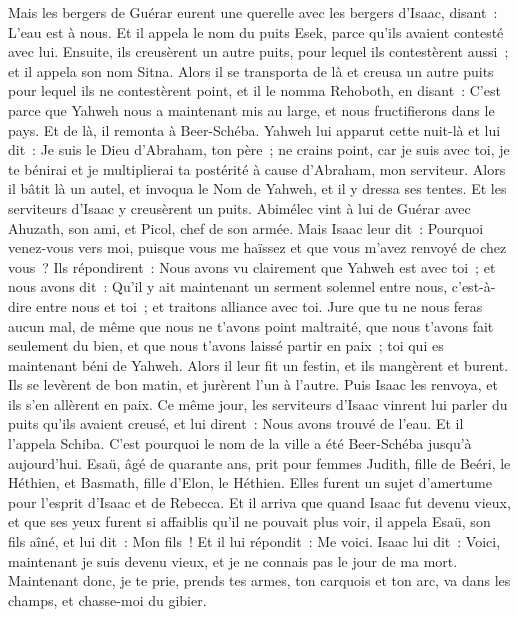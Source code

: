 \begin{multicols}{2}
Mais les bergers de Guérar eurent une querelle avec les bergers d'Isaac, disant~: L'eau est à nous. Et il appela le nom du puits Esek, parce qu'ils avaient contesté avec lui.
Ensuite, ils creusèrent un autre puits, pour lequel ils contestèrent aussi~; et il appela son nom Sitna.
Alors il se transporta de là et creusa un autre puits pour lequel ils ne contestèrent point, et il le nomma Rehoboth, en disant~: C'est parce que Yahweh nous a maintenant mis au large, et nous fructifierons dans le pays.
Et de là, il remonta à Beer-Schéba.
Yahweh lui apparut cette nuit-là et lui dit~: Je suis le Dieu d'Abraham, ton père~; ne crains point, car je suis avec toi, je te bénirai et je multiplierai ta postérité à cause d'Abraham, mon serviteur.
Alors il bâtit là un autel, et invoqua le Nom de Yahweh, et il y dressa ses tentes. Et les serviteurs d'Isaac y creusèrent un puits.
Abimélec vint à lui de Guérar avec Ahuzath, son ami, et Picol, chef de son armée.
Mais Isaac leur dit~: Pourquoi venez-vous vers moi, puisque vous me haïssez et que vous m'avez renvoyé de chez vous~?
Ils répondirent~: Nous avons vu clairement que Yahweh est avec toi~; et nous avons dit~: Qu'il y ait maintenant un serment solennel entre nous, c'est-à-dire entre nous et toi~; et traitons alliance avec toi.
Jure que tu ne nous feras aucun mal, de même que nous ne t'avons point maltraité, que nous t'avons fait seulement du bien, et que nous t'avons laissé partir en paix~; toi qui es maintenant béni de Yahweh.
Alors il leur fit un festin, et ils mangèrent et burent.
Ils se levèrent de bon matin, et jurèrent l'un à l'autre. Puis Isaac les renvoya, et ils s'en allèrent en paix.
Ce même jour, les serviteurs d'Isaac vinrent lui parler du puits qu'ils avaient creusé, et lui dirent~: Nous avons trouvé de l'eau.
Et il l'appela Schiba. C'est pourquoi le nom de la ville a été Beer-Schéba jusqu'à aujourd'hui.
Esaü, âgé de quarante ans, prit pour femmes Judith, fille de Beéri, le Héthien, et Basmath, fille d'Elon, le Héthien.
Elles furent un sujet d'amertume pour l'esprit d'Isaac et de Rebecca.
\VerseOne{}Et il arriva que quand Isaac fut devenu vieux, et que ses yeux furent si affaiblis qu'il ne pouvait plus voir, il appela Esaü, son fils aîné, et lui dit~: Mon fils~! Et il lui répondit~: Me voici.
Isaac lui dit~: Voici, maintenant je suis devenu vieux, et je ne connais pas le jour de ma mort.
Maintenant donc, je te prie, prends tes armes, ton carquois et ton arc, va dans les champs, et chasse-moi du gibier.

\end{multicols}
